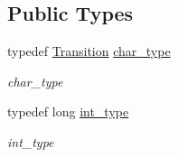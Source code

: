 \subsection*{Public Types}
\begin{DoxyCompactItemize}
\item 
typedef \hyperlink{class_transition}{Transition} \hyperlink{class_transition_a701b8dd85eadbda28008778631ed9c08}{char\+\_\+type}\hypertarget{class_transition_a701b8dd85eadbda28008778631ed9c08}{}\label{class_transition_a701b8dd85eadbda28008778631ed9c08}

\begin{DoxyCompactList}\small\item\em char\+\_\+type \end{DoxyCompactList}\item 
typedef long \hyperlink{class_transition_a2a84af67283a25a2fc2ddd276092adbb}{int\+\_\+type}\hypertarget{class_transition_a2a84af67283a25a2fc2ddd276092adbb}{}\label{class_transition_a2a84af67283a25a2fc2ddd276092adbb}

\begin{DoxyCompactList}\small\item\em int\+\_\+type \end{DoxyCompactList}\end{DoxyCompactItemize}

